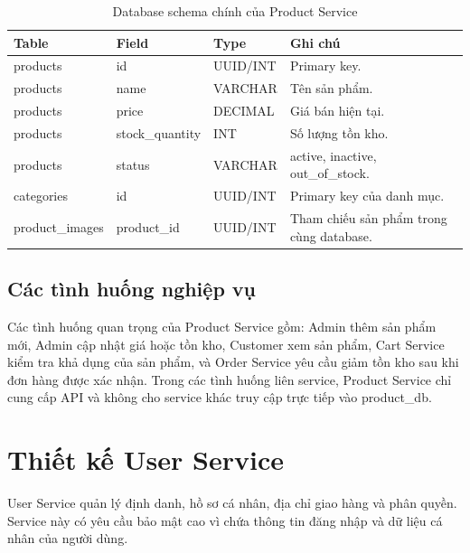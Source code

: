 \documentclass[../main.tex]{subfiles}
\begin{document}
\begin{table}[H]
    \centering
    \caption{Database schema chính của Product Service}
    \label{tab:chapter2-product-db}
    \begin{tabular}{|p{}|p{}|p{}|p{}|}
        \hline
        \rowcolor{primary!35}
        \textbf{Table} & \textbf{Field} & \textbf{Type} & \textbf{Ghi chú} \\
        \hline
        products & id & UUID/INT & Primary key. \\
        \hline
        products & name & VARCHAR & Tên sản phẩm. \\
        \hline
        products & price & DECIMAL & Giá bán hiện tại. \\
        \hline
        products & stock\_quantity & INT & Số lượng tồn kho. \\
        \hline
        products & status & VARCHAR & active, inactive, out\_of\_stock. \\
        \hline
        categories & id & UUID/INT & Primary key của danh mục. \\
        \hline
        product\_images & product\_id & UUID/INT & Tham chiếu sản phẩm trong cùng database. \\
        \hline
    \end{tabular}
\end{table}

\subsection{Các tình huống nghiệp vụ}
\label{subsection:2.3.6}

Các tình huống quan trọng của Product Service gồm: Admin thêm sản phẩm mới, Admin cập nhật giá hoặc tồn kho, Customer xem sản phẩm, Cart Service kiểm tra khả dụng của sản phẩm, và Order Service yêu cầu giảm tồn kho sau khi đơn hàng được xác nhận. Trong các tình huống liên service, Product Service chỉ cung cấp API và không cho service khác truy cập trực tiếp vào product\_db.

\section{Thiết kế User Service}
\label{section:2.4}

User Service quản lý định danh, hồ sơ cá nhân, địa chỉ giao hàng và phân quyền. Service này có yêu cầu bảo mật cao vì chứa thông tin đăng nhập và dữ liệu cá nhân của người dùng.
\end{document}
